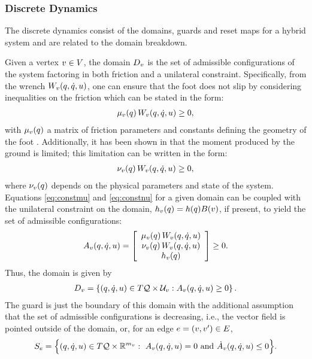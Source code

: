 \subsubsection{Discrete Dynamics} \label{sec:discrete-dynamics}

The discrete dynamics consist of the domains, guards and reset maps for a hybrid
system and are related to the domain breakdown.

Given a vertex $v \in V$, the domain $D_{v}$ is the set of admissible
configurations of the system factoring in both friction and a unilateral
constraint.
%
Specifically, from the wrench $W_{v}(q, \dot{q}, u)$, one can ensure that the foot
does not slip by considering inequalities on the friction which can be stated in
the form:
%
\begin{align}
  \label{eq:constmu}
  \mu_{v}(q) \, W_{v}(q, \dot{q}, u) \geq 0,
\end{align}
%
with $\mu_{v}(q)$ a matrix of friction parameters and constants defining the
geometry of the foot \cite{Grizzle2010}.
%
Additionally, it has been shown in \cite{Chevallereau2009, Vukobratovic1990}
that the moment produced by the ground is limited; this limitation can be
written in the form:
%
\begin{align}
  \label{eq:constnu}
  \nu_{v}(q) \, W_{v}(q, \dot{q}, u) \geq 0,
\end{align}
%
where $\nu_{v}(q)$ depends on the physical parameters and state of the
system.
%
Equations \eqref{eq:constmu} and \eqref{eq:constnu} for a given domain can be
coupled with the unilateral constraint on the domain, $h_{v}(q) = h(q)
B(v)$, if present, to yield the set of admissible configurations:
%
\begin{align}
  \label{admissible}
  A_{v}(q, \dot{q}, u) = \left[ \begin{array}{c}
      \mu_{v}(q) \, W_{v}(q, \dot{q}, u)\\
      \nu_{v}(q) \, W_{v}(q, \dot{q}, u)\\
      h_{v}(q)
    \end{array} \right] \geq 0.
\end{align}
%
Thus, the domain is given by
%
\begin{align}
  \label{eq:domain}
  D_{v} = \left\{ (q, \dot{q}, u) \in T\mathcal{Q} \times \mathcal{U}_{v} : A_{v}(q, \dot{q}, u) \geq 0 \right\}.
\end{align}
%
The guard is just the boundary of this domain with the additional assumption
that the set of admissible configurations is decreasing, i.e., the vector field
is pointed outside of the domain, or, for an edge $e = (v, v') \in E$,
%
\begin{align*}
  S_{e} = \Bigl\{ (q, \dot{q}, u) \in T\mathcal{Q} \times \mathbb{R}^{m_{v}} : \ A_{v}(q, \dot{q}, u) =
  0 \mbox{ and } {\dot A}_{v}(q, \dot{q}, u) \leq 0 \Bigl\}.
\end{align*}

